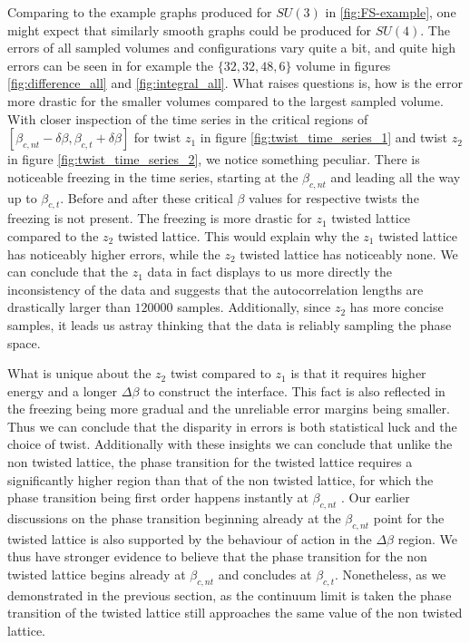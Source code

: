 \documentclass[english,twoside,openright]{UH_TCM_MSc}
\begin{document}
Comparing to the example graphs produced for $SU(3)$ in \ref{fig:FS-example}, one might expect that similarly smooth graphs could be produced for $SU(4)$. The errors of all sampled volumes and configurations vary quite a bit, and quite high errors can be seen in for example the $\{32,32,48,6\}$ volume in figures \ref{fig:difference_all} and \ref{fig:integral_all}. What raises questions is, how is the error more drastic for the smaller volumes compared to the largest sampled volume. With closer inspection of the time series in the critical regions of $[\beta_{c,nt}-\delta\beta,\beta_{c,t} + \delta \beta]$ for twist $z_1$ in figure \ref{fig:twist_time_series_1} and twist $z_2$ in figure \ref{fig:twist_time_series_2}, we notice something peculiar. There is noticeable freezing in the time series, starting at the $\beta_{c,nt}$ and leading all the way up to $\beta_{c,t}$. Before and after these critical $\beta$ values for respective twists the freezing is not present. The freezing is more drastic for $z_1$ twisted lattice compared to the $z_2$ twisted lattice. This would explain why the $z_1$ twisted lattice has noticeably higher errors, while the $z_2$ twisted lattice has noticeably none. We can conclude that the $z_1$ data in fact displays to us more directly the inconsistency of the data and suggests that the autocorrelation lengths are drastically larger than $120000$ samples. Additionally, since $z_2$ has more concise samples, it leads us astray thinking that the data is reliably sampling the phase space.

What is unique about the $z_2$ twist compared to $z_1$ is that it requires higher energy and a longer $\Delta \beta$ to construct the interface. This fact is also reflected in the freezing being more gradual and the unreliable error margins being smaller. Thus we can conclude that the disparity in errors is both statistical luck and the choice of twist. Additionally with these insights we can conclude that unlike the non twisted lattice, the phase transition for the twisted lattice requires a significantly higher region than that of the non twisted lattice, for which the phase transition being first order happens instantly at $\beta_{c,nt}$ \cite{Batrouni,GAVAI2002480}. Our earlier discussions on the phase transition beginning already at the $\beta_{c,nt}$ point for the twisted lattice is also supported by the behaviour of action in the $\Delta \beta$ region. We thus have stronger evidence to believe that the phase transition for the non twisted lattice begins already at $\beta_{c,nt}$ and concludes at $\beta_{c,t}$. Nonetheless, as we demonstrated in the previous section, as the continuum limit is taken the phase transition of the twisted lattice still approaches the same value of the non twisted lattice.
\end{document}
